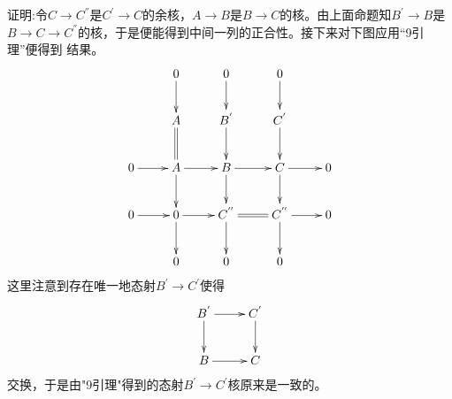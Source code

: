 \documentclass[UTF8]{article}
\begin{document}
证明:令$C\rightarrow C^{''}$是$C^{'}\rightarrow C$的余核，$A\rightarrow B$是$B\rightarrow C$的核。由上面命题知$B^{'}\rightarrow B$是$B\rightarrow C\rightarrow C^{''}$的核，于是便能得到中间一列的正合性。接下来对下图应用“9引理”便得到
结果。
$$
\xymatrix{
	&0\ar[d]&0\ar[d]&0\ar[d]\\
	&A\ar@{=}[d]&B^{'}\ar[d]&C^{'}\ar[d]\\
0\ar[r]	&A\ar[d]\ar[r]&B\ar[d]\ar[r]&C\ar[d]\ar[r]&0\\
	0\ar[r]&0\ar[r]\ar[d]&C^{''}\ar@{=}[r]\ar[d]&C^{''}\ar[r]\ar[d]&0\\
	&0&0&0&\\
}
$$
这里注意到存在唯一地态射$B^{'}\rightarrow C^{'}$使得$$
\xymatrix{
	B^{'}\ar[r]\ar[d]&C^{'}\ar[d]\\
	B\ar[r]&C
}
$$交换，于是由"9引理"得到的态射$B^{'}\rightarrow C^{'}$核原来是一致的。
\end{document}
